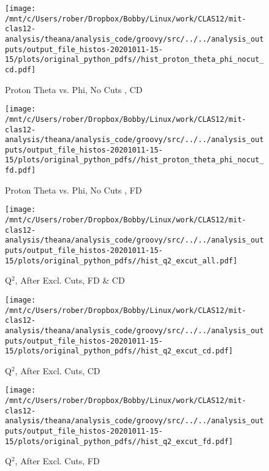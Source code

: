 \documentclass{article}
\begin{document}
\begin{landscape}
\begin{figure}[h]
        \texttt{[image: /mnt/c/Users/rober/Dropbox/Bobby/Linux/work/CLAS12/mit-clas12-analysis/theana/analysis\_code/groovy/src/../../analysis\_outputs/output\_file\_histos-20201011-15-15/plots/original\_python\_pdfs//hist\_proton\_theta\_phi\_nocut\_cd.pdf]}
        \captionsetup{textformat=empty,labelformat=blank}
        \caption{Proton Theta vs. Phi, No Cuts , CD}
    \end{figure}
    \clearpage
    
    \begin{figure}[h]
        \centering

        \texttt{[image: /mnt/c/Users/rober/Dropbox/Bobby/Linux/work/CLAS12/mit-clas12-analysis/theana/analysis\_code/groovy/src/../../analysis\_outputs/output\_file\_histos-20201011-15-15/plots/original\_python\_pdfs//hist\_proton\_theta\_phi\_nocut\_fd.pdf]}
        \captionsetup{textformat=empty,labelformat=blank}
        \caption{Proton Theta vs. Phi, No Cuts , FD}
    \end{figure}
    \clearpage
    
    \begin{figure}[h]
        \centering

        \texttt{[image: /mnt/c/Users/rober/Dropbox/Bobby/Linux/work/CLAS12/mit-clas12-analysis/theana/analysis\_code/groovy/src/../../analysis\_outputs/output\_file\_histos-20201011-15-15/plots/original\_python\_pdfs//hist\_q2\_excut\_all.pdf]}
        \captionsetup{textformat=empty,labelformat=blank}
        \caption{Q$^{2}$, After Excl. Cuts, FD \& CD}
    \end{figure}
    \clearpage
    
    \begin{figure}[h]
        \centering

        \texttt{[image: /mnt/c/Users/rober/Dropbox/Bobby/Linux/work/CLAS12/mit-clas12-analysis/theana/analysis\_code/groovy/src/../../analysis\_outputs/output\_file\_histos-20201011-15-15/plots/original\_python\_pdfs//hist\_q2\_excut\_cd.pdf]}
        \captionsetup{textformat=empty,labelformat=blank}
        \caption{Q$^{2}$, After Excl. Cuts, CD}
    \end{figure}
    \clearpage
    
    \begin{figure}[h]
        \centering

        \texttt{[image: /mnt/c/Users/rober/Dropbox/Bobby/Linux/work/CLAS12/mit-clas12-analysis/theana/analysis\_code/groovy/src/../../analysis\_outputs/output\_file\_histos-20201011-15-15/plots/original\_python\_pdfs//hist\_q2\_excut\_fd.pdf]}
        \captionsetup{textformat=empty,labelformat=blank}
        \caption{Q$^{2}$, After Excl. Cuts, FD}
    \end{figure}
    \clearpage
    

\end{landscape}
\end{document}
